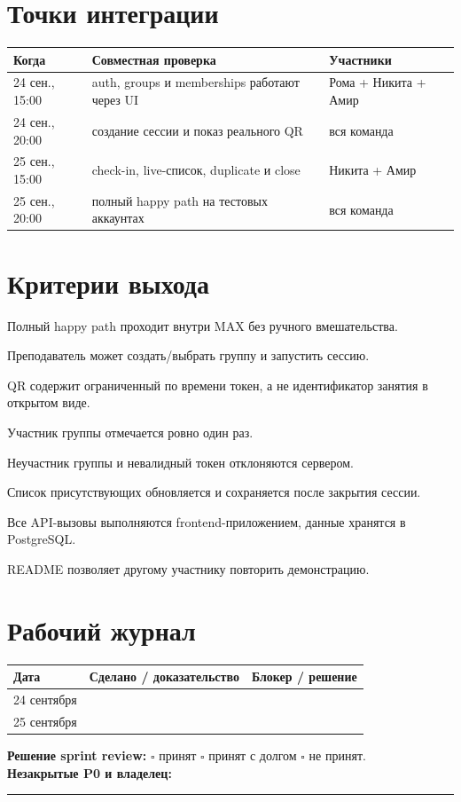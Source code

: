\documentclass[11pt,a4paper]{article}
\begin{document}
\section{Точки интеграции}
\begin{tabularx}{\textwidth}{p{30mm}X>{\raggedright\arraybackslash}p{37mm}}\toprule
Когда & Совместная проверка & Участники\\\midrule
24 сен., 15:00 & auth, groups и memberships работают через UI & Рома + Никита + Амир\\
24 сен., 20:00 & создание сессии и показ реального QR & вся команда\\
25 сен., 15:00 & check-in, live-список, duplicate и close & Никита + Амир\\
25 сен., 20:00 & полный happy path на тестовых аккаунтах & вся команда\\\bottomrule
\end{tabularx}

\section{Критерии выхода}
\begin{tasklist}
  \item Полный happy path проходит внутри MAX без ручного вмешательства.
  \item Преподаватель может создать/выбрать группу и запустить сессию.
  \item QR содержит ограниченный по времени токен, а не идентификатор занятия в открытом виде.
  \item Участник группы отмечается ровно один раз.
  \item Неучастник группы и невалидный токен отклоняются сервером.
  \item Список присутствующих обновляется и сохраняется после закрытия сессии.
  \item Все API-вызовы выполняются frontend-приложением, данные хранятся в PostgreSQL.
  \item README позволяет другому участнику повторить демонстрацию.
\end{tasklist}

\section{Рабочий журнал}
\begin{tabularx}{\textwidth}{p{25mm}X X}\toprule Дата & Сделано / доказательство & Блокер / решение\\\midrule
24 сентября & \rule{0pt}{11mm} & \\
25 сентября & \rule{0pt}{11mm} & \\\bottomrule\end{tabularx}
\vspace{4mm}\begin{goalbox}\textbf{Решение sprint review:} $\square$ принят \quad $\square$ принят с долгом \quad $\square$ не принят.\\[2mm]\textbf{Незакрытые P0 и владелец:} \rule{105mm}{0.4pt}\end{goalbox}
\end{document}

